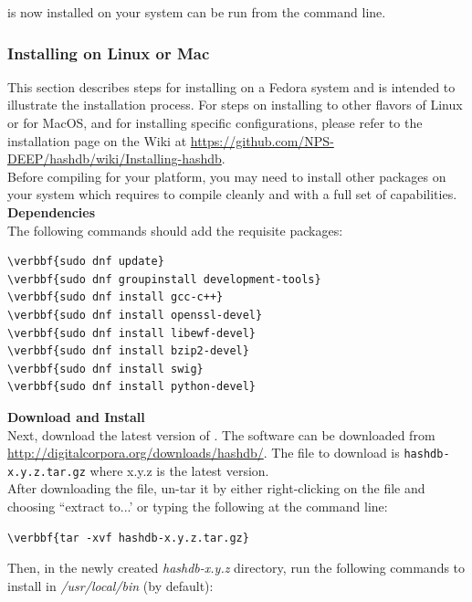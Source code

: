 \documentclass[11pt,fleqn]{article} %
\begin{document}
\hdb is now installed on your system can be run from the command line.\\

\subsubsection{Installing on Linux or Mac}
This section describes steps for installing \hdb on a Fedora system and is intended to illustrate the installation process.  For steps on installing \hdb to other flavors of Linux or for MacOS, and for installing specific configurations, please refer to the installation page on the \hdb Wiki at \url{https://github.com/NPS-DEEP/hashdb/wiki/Installing-hashdb}.\\

Before compiling \hdb for your platform, you may need to install other packages on your system which \hdb requires to compile cleanly and with a full set of capabilities.\\

\textbf{Dependencies}\\
The following commands should add the requisite packages:
\begin{Verbatim}[commandchars=\\\{\}]
\verbbf{sudo dnf update}
\verbbf{sudo dnf groupinstall development-tools}
\verbbf{sudo dnf install gcc-c++}
\verbbf{sudo dnf install openssl-devel}
\verbbf{sudo dnf install libewf-devel}
\verbbf{sudo dnf install bzip2-devel}
\verbbf{sudo dnf install swig}
\verbbf{sudo dnf install python-devel}
\end{Verbatim}

\textbf{Download and Install \hdb}\\
Next, download the latest version of \hdb. The software can be downloaded from \url{http://digitalcorpora.org/downloads/hashdb/}. The file to download is \texttt{hashdb-x.y.z.tar.gz} where x.y.z is the latest version.\\

After downloading the file, un-tar it by either right-clicking on the file and choosing ``extract to...' or typing the following at the command line:
\begin{Verbatim}[commandchars=\\\{\}]
\verbbf{tar -xvf hashdb-x.y.z.tar.gz}
\end{Verbatim}

Then, in the newly created \textit{hashdb-x.y.z} directory, run the following commands to install \hdb in \textit{/usr/local/bin} (by default):
\end{document}
